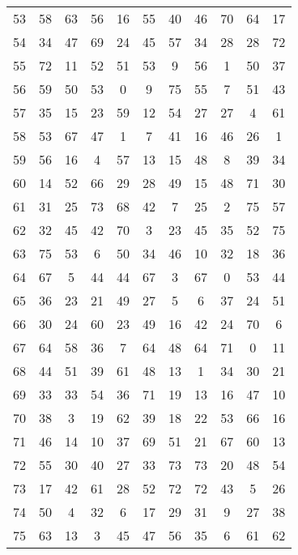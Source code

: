\begin{table}
\begin{tabular}{c c c c c c c c c c c }
53 & 58 & 63 & 56 & 16 & 55 & 40 & 46 & 70 & 64 & 17 \\
54 & 34 & 47 & 69 & 24 & 45 & 57 & 34 & 28 & 28 & 72 \\
55 & 72 & 11 & 52 & 51 & 53 & 9 & 56 & 1 & 50 & 37 \\
56 & 59 & 50 & 53 & 0 & 9 & 75 & 55 & 7 & 51 & 43 \\
57 & 35 & 15 & 23 & 59 & 12 & 54 & 27 & 27 & 4 & 61 \\
58 & 53 & 67 & 47 & 1 & 7 & 41 & 16 & 46 & 26 & 1 \\
59 & 56 & 16 & 4 & 57 & 13 & 15 & 48 & 8 & 39 & 34 \\
60 & 14 & 52 & 66 & 29 & 28 & 49 & 15 & 48 & 71 & 30 \\
61 & 31 & 25 & 73 & 68 & 42 & 7 & 25 & 2 & 75 & 57 \\
62 & 32 & 45 & 42 & 70 & 3 & 23 & 45 & 35 & 52 & 75 \\
63 & 75 & 53 & 6 & 50 & 34 & 46 & 10 & 32 & 18 & 36 \\
64 & 67 & 5 & 44 & 44 & 67 & 3 & 67 & 0 & 53 & 44 \\
65 & 36 & 23 & 21 & 49 & 27 & 5 & 6 & 37 & 24 & 51 \\
66 & 30 & 24 & 60 & 23 & 49 & 16 & 42 & 24 & 70 & 6 \\
67 & 64 & 58 & 36 & 7 & 64 & 48 & 64 & 71 & 0 & 11 \\
68 & 44 & 51 & 39 & 61 & 48 & 13 & 1 & 34 & 30 & 21 \\
69 & 33 & 33 & 54 & 36 & 71 & 19 & 13 & 16 & 47 & 10 \\
70 & 38 & 3 & 19 & 62 & 39 & 18 & 22 & 53 & 66 & 16 \\
71 & 46 & 14 & 10 & 37 & 69 & 51 & 21 & 67 & 60 & 13 \\
72 & 55 & 30 & 40 & 27 & 33 & 73 & 73 & 20 & 48 & 54 \\
73 & 17 & 42 & 61 & 28 & 52 & 72 & 72 & 43 & 5 & 26 \\
74 & 50 & 4 & 32 & 6 & 17 & 29 & 31 & 9 & 27 & 38 \\
75 & 63 & 13 & 3 & 45 & 47 & 56 & 35 & 6 & 61 & 62 \\
\hline
\end{tabular}
\end{table}